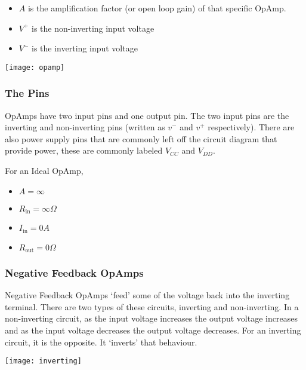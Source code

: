 \documentclass[12pt]{article}
\begin{document}
\begin{itemize}
  \item $A$ is the amplification factor (or open loop gain) of that specific OpAmp. 
  \item $V^+$ is the non-inverting input voltage 
  \item $V^-$ is the inverting input voltage
\end{itemize}

\begin{marginfigure}
  \texttt{[image: opamp]}
\end{marginfigure}

\subsubsection{The Pins}
OpAmps have two input pins and one output pin.
The two input pins are the inverting and non-inverting pins (written as $v^{-}$ and $v^{+}$ respectively).
There are also power supply pins that are commonly left off the circuit diagram that provide power, these are commonly labeled $V_{CC}$ and $V_{DD}$.

\begin{marginfigure}
  \vspace{ 2cm }
  For an Ideal OpAmp,
  \begin{itemize}
    \item $A = \infty$
    \item $R_{\text{in}} = \infty\Omega$
    \item $I_{\text{in}} = 0A$
    \item $R_{\text{out}} = 0\Omega$
  \end{itemize}
\end{marginfigure}

\subsubsection{Negative Feedback OpAmps}
Negative Feedback OpAmps `feed' some of the voltage back into the inverting terminal.
There are two types of these circuits, inverting and non-inverting.
In a non-inverting circuit, as the input voltage increases the output voltage increases and as the input voltage decreases the output voltage decreases.
For an inverting circuit, it is the opposite.
It `inverts' that behaviour.

\begin{center}
  \texttt{[image: inverting]}
\end{center}
\end{document}

